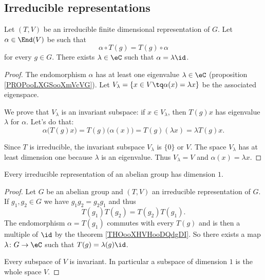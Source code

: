 \subsection{Irreducible representations}


\begin{theorem}   \label{THOooXHVHooDQdgDI}
	Let \( (T,V)\) be an irreducible finite dimensional representation of \( G\). Let \( \alpha\in \End(V)\) be such that
	\begin{equation}
		\alpha\circ T(g)=T(g)\circ \alpha
	\end{equation}
	for every \( g\in G\). There exists \( \lambda\in \eC\) such that \( \alpha=\lambda\id\).
\end{theorem}

\begin{proof}
	The endomorphism \( \alpha\) has at least one eigenvalue \( \lambda\in \eC\) (proposition \ref{PROPooLXGSooXmVcVG}). Let \( V_{\lambda}=\{ x\in V\tq \alpha(x)=\lambda x \}\) be the associated eigenspace.

	We prove that \( V_{\lambda}\) is an invariant subspace: if \( x\in V_{\lambda}\), then \( T(g)x\) has eigenvalue \( \lambda\) for \( \alpha\). Let's do that:
	\begin{equation}
		\alpha\big( T(g)x \big)=T(g)\big( \alpha(x) \big)=T(g)(\lambda x)=\lambda T(g)x.
	\end{equation}

	Since \( T\) is irreducible, the invariant subspace \( V_{\lambda}\) is \( \{ 0 \}\) or \( V\). The space \( V_{\lambda}\) has at least dimension one because \( \lambda\) is an eigenvalue. Thus \( V_{\lambda}=V\) and \( \alpha(x)=\lambda x\).
\end{proof}

\begin{theorem}       \label{THOooFFJGooCekFQc}
	Every irreducible representation of an abelian group has dimension \( 1\).
\end{theorem}

\begin{proof}
	Let \( G\) be an abelian group and \( (T,V)\) an irreducible representation of \( G\). If \( g_1,g_2\in G\) we have \( g_1g_2=g_2g_1\) and thus
	\begin{equation}
		T(g_1)T(g_2)=T(g_2)T(g_1).
	\end{equation}
	The endomorphism \( \alpha=T(g_1)\) commutes with every \( T(g)\) and is then a multiple of \( \id\) by the theorem \ref{THOooXHVHooDQdgDI}. So there exists a map \( \lambda\colon G\to \eC\) such that \( T(g)=\lambda(g)\id\).

	Every subspace of \( V\) is invariant. In particular a subspace of dimension \( 1\) is the whole space \( V\).
\end{proof}

